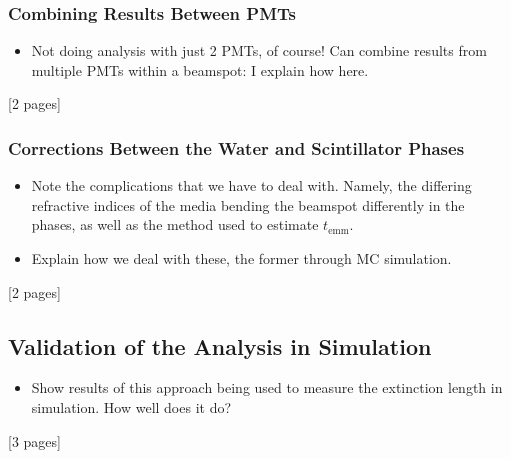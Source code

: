 {\subsubsection{Combining Results Between PMTs}
\begin{itemize}
    \item Not doing analysis with just 2 PMTs, of course! Can combine results from multiple PMTs within a beamspot: I explain how here.
\end{itemize}
[2 pages]

\subsubsection{Corrections Between the Water and Scintillator Phases}
\begin{itemize}
    \item Note the complications that we have to deal with. Namely, the differing refractive indices of the media bending the beamspot differently in the phases, as well as the method used to estimate $t_{\textrm{emm}}$.
    \item Explain how we deal with these, the former through MC simulation.
\end{itemize}
[2 pages]
\subsection{Validation of the Analysis in Simulation}
\begin{itemize}
    \item Show results of this approach being used to measure the extinction length in simulation. How well does it do?
\end{itemize}
[3 pages]
}
